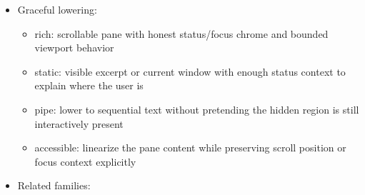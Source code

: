 \begin{itemize}
\begin{itemize}
  \item
    gutter chrome should communicate focus and workspace ownership, not carry primary content meaning
  \item
    \texttt{b\allowbreak{}r\allowbreak{}o\allowbreak{}w\allowbreak{}s\allowbreak{}a\allowbreak{}b\allowbreak{}l\allowbreak{}e\allowbreak{}L\allowbreak{}i\allowbreak{}s\allowbreak{}t\allowbreak{}S\allowbreak{}u\allowbreak{}r\allowbreak{}f\allowbreak{}a\allowbreak{}c\allowbreak{}e\allowbreak{}(\allowbreak{})}, \texttt{f\allowbreak{}i\allowbreak{}l\allowbreak{}e\allowbreak{}P\allowbreak{}i\allowbreak{}c\allowbreak{}k\allowbreak{}e\allowbreak{}r\allowbreak{}S\allowbreak{}u\allowbreak{}r\allowbreak{}f\allowbreak{}a\allowbreak{}c\allowbreak{}e\allowbreak{}(\allowbreak{})}, and \texttt{c\allowbreak{}o\allowbreak{}m\allowbreak{}m\allowbreak{}a\allowbreak{}n\allowbreak{}d\allowbreak{}P\allowbreak{}a\allowbreak{}l\allowbreak{}e\allowbreak{}t\allowbreak{}t\allowbreak{}e\allowbreak{}S\allowbreak{}u\allowbreak{}r\allowbreak{}f\allowbreak{}a\allowbreak{}c\allowbreak{}e\allowbreak{}(\allowbreak{})} now converge on viewport semantics; \texttt{n\allowbreak{}a\allowbreak{}v\allowbreak{}i\allowbreak{}g\allowbreak{}a\allowbreak{}b\allowbreak{}l\allowbreak{}e\allowbreak{}T\allowbreak{}a\allowbreak{}b\allowbreak{}l\allowbreak{}e\allowbreak{}(\allowbreak{})} remains the row-aware holdout because wrapped-row comparison still needs a more specialized scroll model
  \item
    viewport masking is the wrong abstraction when the user thinks in semantic rows rather than rendered lines; in that case keep row-aware scroll ownership local to the domain-specific component
  \end{itemize}
\item
  Graceful lowering:

  \begin{itemize}
  \tightlist
  \item
    rich: scrollable pane with honest status/focus chrome and bounded viewport behavior
  \item
    static: visible excerpt or current window with enough status context to explain where the user is
  \item
    pipe: lower to sequential text without pretending the hidden region is still interactively present
  \item
    accessible: linearize the pane content while preserving scroll position or focus context explicitly
  \end{itemize}
\item
  Related families:


\end{itemize}
